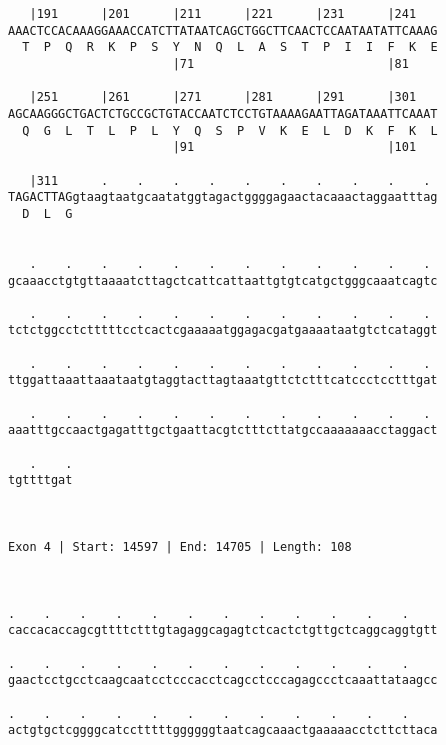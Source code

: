 \documentclass{article}
\begin{document}
\begin{Verbatim}
   |191      |201      |211      |221      |231      |241   
AAACTCCACAAAGGAAACCATCTTATAATCAGCTGGCTTCAACTCCAATAATATTCAAAG
  T  P  Q  R  K  P  S  Y  N  Q  L  A  S  T  P  I  I  F  K  E
                       |71                           |81    
  
   |251      |261      |271      |281      |291      |301   
AGCAAGGGCTGACTCTGCCGCTGTACCAATCTCCTGTAAAAGAATTAGATAAATTCAAAT
  Q  G  L  T  L  P  L  Y  Q  S  P  V  K  E  L  D  K  F  K  L
                       |91                           |101   
  
   |311      .    .    .    .    .    .    .    .    .    . 
TAGACTTAGgtaagtaatgcaatatggtagactggggagaactacaaactaggaatttag
  D  L  G                                                   
                                                            
  
   .    .    .    .    .    .    .    .    .    .    .    . 
gcaaacctgtgttaaaatcttagctcattcattaattgtgtcatgctgggcaaatcagtc
                                                            
   .    .    .    .    .    .    .    .    .    .    .    . 
tctctggcctctttttcctcactcgaaaaatggagacgatgaaaataatgtctcataggt
                                                            
   .    .    .    .    .    .    .    .    .    .    .    . 
ttggattaaattaaataatgtaggtacttagtaaatgttctctttcatccctcctttgat
                                                            
   .    .    .    .    .    .    .    .    .    .    .    . 
aaatttgccaactgagatttgctgaattacgtctttcttatgccaaaaaaacctaggact
                                                            
   .    .
tgttttgat
         
         
 
Exon 4 | Start: 14597 | End: 14705 | Length: 108



.    .    .    .    .    .    .    .    .    .    .    .    
caccacaccagcgttttctttgtagaggcagagtctcactctgttgctcaggcaggtgtt
                                                            
.    .    .    .    .    .    .    .    .    .    .    .    
gaactcctgcctcaagcaatcctcccacctcagcctcccagagccctcaaattataagcc
                                                            
.    .    .    .    .    .    .    .    .    .    .    .    
actgtgctcggggcatcctttttggggggtaatcagcaaactgaaaaacctcttcttaca
                                                            

\end{Verbatim}
\end{document}
